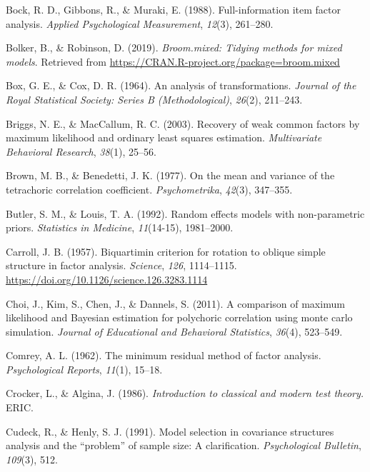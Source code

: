 \documentclass[
  english,
  man]{apa6}
\begin{document}
\leavevmode\hypertarget{ref-bock1988}{}%
Bock, R. D., Gibbons, R., \& Muraki, E. (1988). Full-information item factor analysis. \emph{Applied Psychological Measurement}, \emph{12}(3), 261--280.

\leavevmode\hypertarget{ref-R-broom.mixed}{}%
Bolker, B., \& Robinson, D. (2019). \emph{Broom.mixed: Tidying methods for mixed models}. Retrieved from \url{https://CRAN.R-project.org/package=broom.mixed}

\leavevmode\hypertarget{ref-box1964}{}%
Box, G. E., \& Cox, D. R. (1964). An analysis of transformations. \emph{Journal of the Royal Statistical Society: Series B (Methodological)}, \emph{26}(2), 211--243.

\leavevmode\hypertarget{ref-briggs2003}{}%
Briggs, N. E., \& MacCallum, R. C. (2003). Recovery of weak common factors by maximum likelihood and ordinary least squares estimation. \emph{Multivariate Behavioral Research}, \emph{38}(1), 25--56.

\leavevmode\hypertarget{ref-brown1977mean}{}%
Brown, M. B., \& Benedetti, J. K. (1977). On the mean and variance of the tetrachoric correlation coefficient. \emph{Psychometrika}, \emph{42}(3), 347--355.

\leavevmode\hypertarget{ref-butler1992}{}%
Butler, S. M., \& Louis, T. A. (1992). Random effects models with non-parametric priors. \emph{Statistics in Medicine}, \emph{11}(14-15), 1981--2000.

\leavevmode\hypertarget{ref-carroll1957}{}%
Carroll, J. B. (1957). Biquartimin criterion for rotation to oblique simple structure in factor analysis. \emph{Science}, \emph{126}, 1114--1115. \url{https://doi.org/10.1126/science.126.3283.1114}

\leavevmode\hypertarget{ref-choi2011}{}%
Choi, J., Kim, S., Chen, J., \& Dannels, S. (2011). A comparison of maximum likelihood and Bayesian estimation for polychoric correlation using monte carlo simulation. \emph{Journal of Educational and Behavioral Statistics}, \emph{36}(4), 523--549.

\leavevmode\hypertarget{ref-comrey1962minimum}{}%
Comrey, A. L. (1962). The minimum residual method of factor analysis. \emph{Psychological Reports}, \emph{11}(1), 15--18.

\leavevmode\hypertarget{ref-CrockerAlgina}{}%
Crocker, L., \& Algina, J. (1986). \emph{Introduction to classical and modern test theory.} ERIC.

\leavevmode\hypertarget{ref-cudeck1991model}{}%
Cudeck, R., \& Henly, S. J. (1991). Model selection in covariance structures analysis and the ``problem'' of sample size: A clarification. \emph{Psychological Bulletin}, \emph{109}(3), 512.
\end{document}
